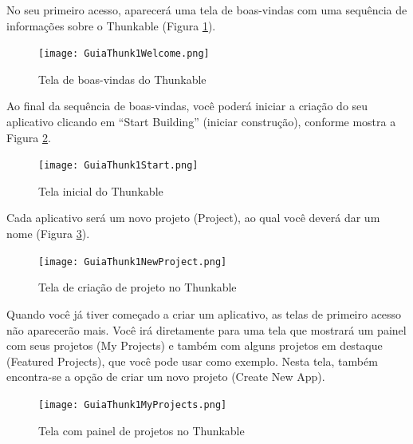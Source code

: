 \documentclass[11pt,fleqn]{book} %
\begin{document}
No seu primeiro acesso, aparecerá uma tela de boas-vindas com uma sequência de informações sobre o Thunkable (Figura \ref{fig:welcome}).

\begin{figure}[H]
    \centering
    \texttt{[image: GuiaThunk1Welcome.png]}
    \caption{Tela de boas-vindas do Thunkable}\label{fig:welcome}
\end{figure}

Ao final da sequência de boas-vindas, você poderá iniciar a criação do seu aplicativo clicando em ``Start Building'' (iniciar construção), conforme mostra a Figura \ref{fig:start}.


\begin{figure}[H]
    \centering
    \texttt{[image: GuiaThunk1Start.png]}
    \caption{Tela inicial do Thunkable}\label{fig:start}
\end{figure}

Cada aplicativo será um novo projeto (Project), ao qual você deverá dar um nome (Figura \ref{fig:newproject}).

\begin{figure}[H]
    \centering
    \texttt{[image: GuiaThunk1NewProject.png]}
    \caption{Tela de criação de projeto no Thunkable}\label{fig:newproject}
\end{figure}

Quando você já tiver começado a criar um aplicativo, as telas de primeiro acesso não aparecerão mais. Você irá diretamente para uma tela que mostrará um painel com seus projetos (My Projects) e também com alguns projetos em destaque (Featured Projects), que você pode usar como exemplo. Nesta tela, também encontra-se a opção de criar um novo projeto (Create New App).

\begin{figure}[H]
    \centering
    \texttt{[image: GuiaThunk1MyProjects.png]}
    \caption{Tela com painel de projetos no Thunkable}\label{fig:myprojects}
\end{figure}



\end{document}

